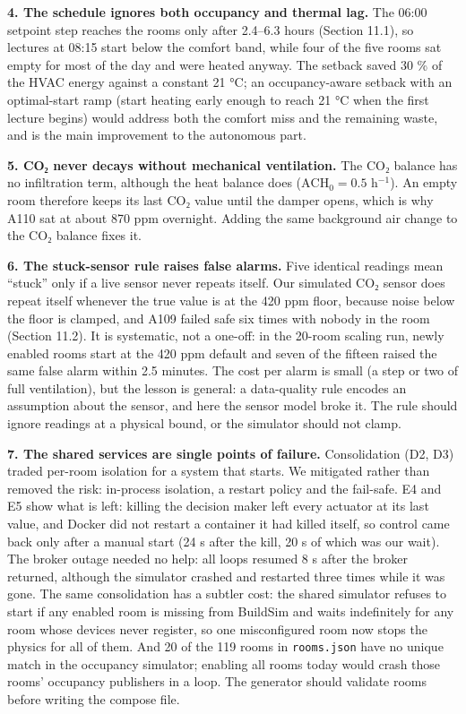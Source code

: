 \documentclass[11pt]{article}
\makeatletter
\DeclareRobustCommand{\_}{\ifmmode\nfss@text{\textunderscore}\else\textunderscore\allowbreak\fi}
\newcommand{\file}[1]{\texttt{#1}}
\makeatother
\begin{document}
\textbf{4. The schedule ignores both occupancy and thermal lag.} The 06:00
setpoint step reaches the rooms only after 2.4–6.3 hours (Section 11.1), so
lectures at 08:15 start below the comfort band, while four of the five rooms sat
empty for most of the day and were heated anyway. The setback saved
30 \% of the HVAC energy against a constant 21 °C; an occupancy-aware setback with an
optimal-start ramp (start heating early enough to reach 21 °C when the first
lecture begins) would address both the comfort miss and the remaining waste, and
is the main improvement to the autonomous part.

\textbf{5. CO₂ never decays without mechanical ventilation.} The CO₂ balance has no
infiltration term, although the heat balance does ($\text{ACH}_0 = 0.5$
h$^{-1}$). An empty room therefore keeps its last CO₂ value until the damper
opens, which is why A110 sat at about 870 ppm overnight. Adding the same
background air change to the CO₂ balance fixes it.

\textbf{6. The stuck-sensor rule raises false alarms.} Five identical readings
mean ``stuck'' only if a live sensor never repeats itself. Our simulated CO₂
sensor does repeat itself whenever the true value is at the 420 ppm floor, because
noise below the floor is clamped, and A109 failed safe six times with nobody in
the room (Section 11.2). It is systematic, not a one-off: in the 20-room scaling
run, newly enabled rooms start at the 420 ppm default and seven of the fifteen
raised the same false alarm within 2.5 minutes. The cost per alarm is small (a
step or two of full ventilation), but the lesson is general: a data-quality rule encodes an assumption about the
sensor, and here the sensor model broke it. The rule should ignore readings at a
physical bound, or the simulator should not clamp.

\textbf{7. The shared services are single points of failure.} Consolidation (D2,
D3) traded per-room isolation for a system that starts. We mitigated rather than
removed the risk: in-process isolation, a restart policy and the fail-safe.
E4 and E5 show what is left: killing the decision maker left every actuator at its last value, and Docker did not restart a container it had killed itself, so control came back only after a manual start (24 s after the kill, 20 s of which was our wait). The broker outage needed no help: all loops resumed 8 s after the broker returned, although the simulator crashed and restarted three times while it was gone. The same consolidation has a subtler
cost: the shared simulator refuses to start if any enabled room is missing from
BuildSim and waits indefinitely for any room whose devices never register, so one
misconfigured room now stops the physics for all of them. And 20 of the 119 rooms
in \file{rooms.json} have no unique match in the occupancy simulator; enabling all
rooms today would crash those rooms' occupancy publishers in a loop. The generator
should validate rooms before writing the compose file.
\end{document}
